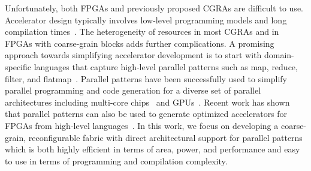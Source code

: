 Unfortunately, both FPGAs and previously proposed CGRAs are difficult
to use. Accelerator design typically involves low-level programming
models and long compilation times~\cite{fpgaVsAsic, fpgaSurvey,
  fpgaProgramming}. The heterogeneity of resources in most CGRAs and
in FPGAs with coarse-grain blocks adds further complications.
A promising approach towards simplifying accelerator development is to
start with domain-specific languages that capture high-level parallel
patterns such as map, reduce, filter, and
flatmap~\cite{ecoop13sujeeth,pldi13halide}.  Parallel patterns have
been successfully used to simplify parallel programming and code
generation for a diverse set of parallel architectures including
multi-core chips~\cite{scala,haskell,delite-tecs14} and
GPUs~\cite{catanzaro11copperhead,micro14lee}.  Recent work has shown
that parallel patterns can also be used to generate optimized accelerators
for FPGAs from high-level languages~\cite{delite2maxj,george14fpl}.
In this work, we focus on developing a coarse-grain, reconfigurable
fabric with direct architectural support for parallel patterns which
is both highly efficient in terms of area, power, and performance and
easy to use in terms of programming and compilation complexity.


